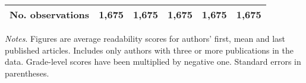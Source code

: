 \begin{table}[H]
\begin{threeparttable}
\begin{tabular}{p{3cm}S@{}S@{}S@{}S@{}S@{}}
            \midrule
            No. observations              &       1,675&       1,675&       1,675&       1,675&       1,675\\
            \bottomrule
        \end{tabular}
        \begin{tablenotes}
            \tiny
            \item \textit{Notes}. Figures are average readability scores for authors' first, mean and last published articles. Includes only authors with three or more publications in the data. Grade-level scores have been multiplied by negative one. Standard errors in parentheses.
        \end{tablenotes}
    \end{threeparttable}
\end{table}